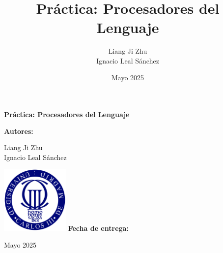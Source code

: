 \documentclass[a4paper,landscape]{article}
\title{Práctica: Procesadores del Lenguaje}
\author{Liang Ji Zhu \\ Ignacio Leal Sánchez}
\date{Mayo 2025}
\begin{document}
\pagestyle{empty}
\begin{titlepage}
    \centering
    \vspace*{2cm}
    {\Huge \bfseries Práctica: Procesadores del Lenguaje}\par
    \vspace{1.5cm}
    {\Large \bfseries Autores:}\par
    {\large Liang Ji Zhu \\ Ignacio Leal Sánchez}\par
    \vfill
    \includegraphics[width=0.25\textwidth]{logo_universidad.png}
    \vfill
    {\large \bfseries Fecha de entrega:}\par
    Mayo 2025\par
    \vfill
\end{titlepage}

\newpage
\pagestyle{plain} %


\end{document}
